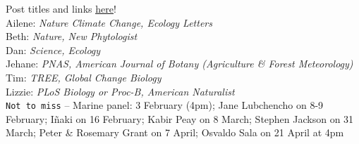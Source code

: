 \documentclass[11pt]{article}
\newenvironment{smitemize}{
\begin{itemize}
  \setlength{\itemsep}{0pt}
  \setlength{\parskip}{0.8pt}
  \setlength{\parsep}{0pt}}
{\end{itemize}
}
\begin{document}
 Post titles and links \href{https://docs.google.com/document/d/1j0WdDbjdp8ERLSO7whvtnP-tOblYMlX33TSCXy_uRKo/edit?usp=sharing}{\underline{here}}!\\
Ailene: \emph{Nature Climate Change, Ecology Letters}\\
Beth: \emph{Nature, New Phytologist}\\
Dan: \emph{Science, Ecology}\\
Jehane: \emph{PNAS, American Journal of Botany (Agriculture \& Forest Meteorology)}\\
Tim: \emph{TREE, Global Change Biology}\\
Lizzie: \emph{PLoS Biology or Proc-B, American Naturalist}\\
\vspace{6pt}
\verb|Not to miss| -- Marine panel: 3 February (4pm);  Jane
Lubchencho on 8-9 February; I\~naki on 16 February; Kabir Peay on 8 March; Stephen Jackson on
31 March; Peter \& Rosemary Grant on 7 April; Osvaldo Sala on 21 April at 4pm \\

\vspace{2ex}

\iffalse
\noindent {\bf HUH seminars not to miss:}
\begin{smitemize}
\item 7 April: Elizabeth Farnsworth
\item 14 April: Brian Anacker
\end{smitemize}
\fi
\end{document}
